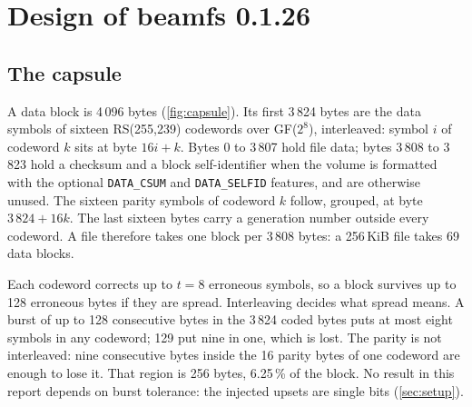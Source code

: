 \section{Design of beamfs 0.1.26}\label{sec:design}

\subsection{The capsule}\label{sec:capsule}

A \bfs data block is 4\,096 bytes (\cref{fig:capsule}). Its first 3\,824
bytes are the data symbols of sixteen RS(255,239) codewords over
GF($2^8$), interleaved: symbol $i$ of codeword $k$ sits at byte
$16i+k$. Bytes 0 to 3\,807 hold file data; bytes 3\,808 to 3\,823 hold a
checksum and a block self-identifier when the volume is formatted with
the optional \texttt{DATA\_CSUM} and \texttt{DATA\_SELFID} features, and
are otherwise unused. The sixteen parity symbols of codeword $k$ follow,
grouped, at byte $3\,824+16k$. The last sixteen bytes carry a generation
number outside every codeword. A file therefore takes one block per
3\,808 bytes: a 256\,KiB file takes 69 data blocks.

Each codeword corrects up to $t=8$ erroneous symbols, so a block
survives up to 128 erroneous bytes if they are spread. Interleaving
decides what spread means. A burst of up to 128 consecutive bytes in the
3\,824 coded bytes puts at most eight symbols in any codeword; 129 put
nine in one, which is lost. The parity is not interleaved: nine
consecutive bytes inside the 16 parity bytes of one codeword are enough
to lose it. That region is 256 bytes, 6.25\,\% of the block. No result
in this report depends on burst tolerance: the injected upsets are
single bits (\cref{sec:setup}).

